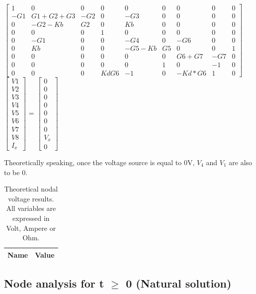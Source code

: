 $\begin{bmatrix}
1 & 0 & 0 & 0 & 0 & 0 & 0 & 0 & 0\\
-G1 & G1+G2+G3 & -G2 & 0 & -G3 & 0 & 0 & 0 & 0\\
0 & -G2-Kb & G2 & 0 & Kb & 0 & 0 & 0 & 0\\
0 & 0 & 0 & 1 & 0 & 0 & 0 & 0 & 0\\
0 & -G1 & 0 & 0 & -G4 & 0 & -G6 & 0 & 0\\
0 & Kb & 0 & 0 & -G5-Kb & G5 & 0 & 0 & 1\\
0 & 0 & 0 & 0 & 0 & 0 & G6+G7& -G7 & 0\\
0 & 0 & 0 & 0 & 0 & 1 & 0 & -1 & 0\\
0 & 0 & 0 & KdG6 & -1 & 0 & -Kd*G6 & 1 & 0
\end{bmatrix}$
$\begin{bmatrix}
V1 \\ V2 \\ V3 \\ V4 \\ V5 \\ V6 \\ V7 \\ V8 \\ I_{x}
\end{bmatrix}$
= 
$\begin{bmatrix}
0 \\ 0 \\ 0 \\ 0 \\ 0 \\ 0 \\ 0 \\ V_{x} \\ 0
\end{bmatrix}$

\par Theoretically speaking, once the voltage source is equal to 0V, $V_{4}$ and  $V_{1}$ are also to be 0. 

\begin{table}[]
  \centering
  \begin{tabular}{|l|r|}
    \hline    
    {\bf Name} & {\bf Value} \\ \hline
    
  \end{tabular}
  \caption{Theoretical nodal voltage results. All variables are expressed in Volt, Ampere or Ohm.}
  \label{tab:p2}
\end{table}


\clearpage

\subsection{Node analysis for t $\ge$ 0 (Natural solution)}


